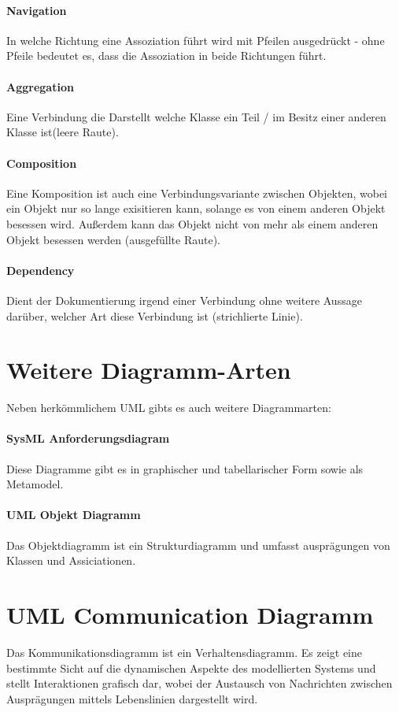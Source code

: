 \paragraph{Navigation}
In welche Richtung eine Assoziation führt wird mit Pfeilen ausgedrückt - ohne Pfeile bedeutet es, dass die Assoziation in beide Richtungen führt.

\paragraph{Aggregation}
Eine Verbindung die Darstellt welche Klasse ein Teil / im Besitz einer anderen Klasse ist(leere Raute).

\paragraph{Composition}
Eine Komposition ist auch eine Verbindungsvariante zwischen Objekten, wobei ein Objekt nur so lange exisitieren kann, solange es von einem anderen Objekt besessen wird. Außerdem kann das Objekt nicht von mehr als einem anderen Objekt besessen werden (ausgefüllte Raute).

\paragraph{Dependency}
Dient der Dokumentierung irgend einer Verbindung ohne weitere Aussage darüber, welcher Art diese Verbindung ist (strichlierte Linie).

\section{Weitere Diagramm-Arten}
Neben herkömmlichem UML gibts es auch weitere Diagrammarten: 

\paragraph{SysML Anforderungsdiagram}
Diese Diagramme gibt es in graphischer und tabellarischer Form sowie als Metamodel.

\paragraph{UML Objekt Diagramm}
Das Objektdiagramm ist ein Strukturdiagramm und umfasst ausprägungen von Klassen und Assiciationen.

\section{UML Communication Diagramm}
Das Kommunikationsdiagramm ist ein Verhaltensdiagramm. Es zeigt eine bestimmte Sicht auf die dynamischen Aspekte des modellierten Systems und stellt Interaktionen grafisch dar, wobei der Austausch von Nachrichten zwischen Ausprägungen mittels Lebenslinien dargestellt wird.

